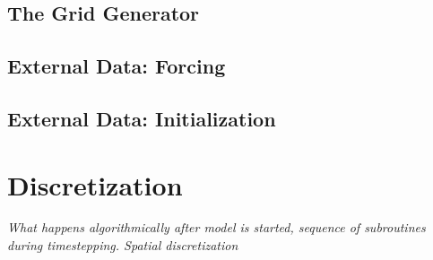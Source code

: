 \documentclass[a4paper,10pt]{article}
\begin{document}
\subsection{The Grid Generator}


\subsection{External Data: Forcing}

\subsection{External Data: Initialization}

\section{Discretization}
{\it What happens algorithmically after model is started, sequence of subroutines during timestepping.
Spatial discretization}
\end{document}
